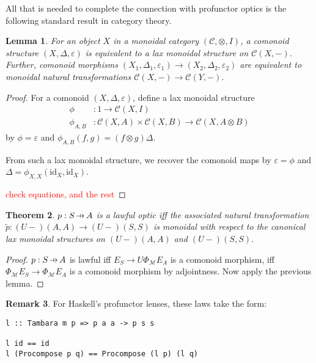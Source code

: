 \documentclass[11pt,letterpaper]{article}
\theoremstyle{plain}
\newtheorem{theorem}{Theorem}[subsection]
\newtheorem{lemma}[theorem]{Lemma}
\theoremstyle{definition}
\newtheorem{remark}[theorem]{Remark}
\newcommand{\C}{\mathscr{C}}
\newcommand{\M}{\mathscr{M}}
\newcommand{\id}{\mathrm{id}}
\newcommand{\hto}{\ensuremath{\,\mathaccent\shortmid\rightarrow\,}}
\newcommand{\todo}[1]{\textcolor{red}{\small #1}}
\begin{document}
All that is needed to complete the connection with profunctor optics is the following standard result in category theory.

\begin{lemma}
  For an object $X$ in a monoidal category $(\C, \otimes, I)$, a comonoid structure $(X,\Delta,\varepsilon)$ is equivalent to a lax monoidal structure on $\C(X, -)$. Further, comonoid morphisms $(X_1,\Delta_1,\varepsilon_1) \to (X_2,\Delta_2,\varepsilon_2)$ are equivalent to monoidal natural transformations $\C(X, -) \to \C(Y, -)$.
\end{lemma}
\begin{proof}
  For a comonoid $(X,\Delta,\varepsilon)$, define a lax monoidal structure
  \begin{align*}
    \phi &: 1 \to \C(X, I) \\
    \phi_{A, B} &: \C(X, A) \times \C(X, B) \to \C(X, A \otimes B)
  \end{align*}
  by $\phi = \varepsilon$ and $\phi_{A, B}(f, g) = (f \otimes g) \Delta$.

  From such a lax monoidal structure, we recover the comonoid maps by $\varepsilon = \phi$ and $\Delta = \phi_{X, X}(\id_X, \id_X)$.

  \todo{check equations, and the rest}
\end{proof}

\begin{theorem}
  $p : S \hto A$ is a lawful optic iff the associated natural transformation $\tilde{p} : (U-)(A,A) \to (U-)(S,S)$ is monoidal with respect to the canonical lax monoidal structures on $(U-)(A,A)$ and $(U-)(S,S)$.
\end{theorem}
\begin{proof}
  $p : S \hto A$ is lawful iff $E_S \rightarrow U \Phi_\M E_A$ is a comonoid morphism, iff $\Phi_\M E_S \rightarrow \Phi_\M E_A$ is a comonoid morphism by adjointness. Now apply the previous lemma.
\end{proof}

\begin{remark}
  For Haskell's profunctor lenses, these laws take the form:
\begin{verbatim}
l :: Tambara m p => p a a -> p s s

l id == id
l (Procompose p q) == Procompose (l p) (l q)
\end{verbatim}
\end{remark}
\end{document}
